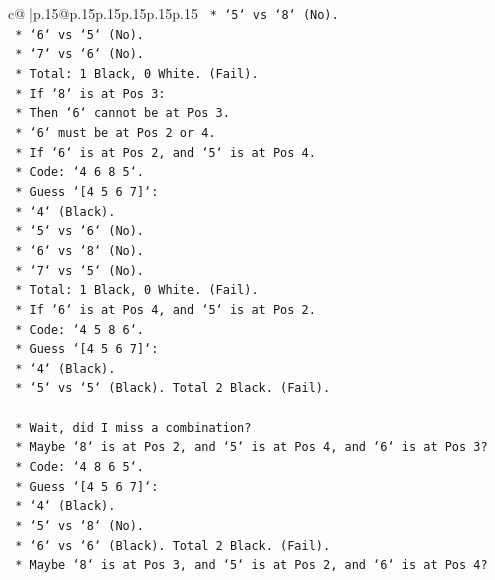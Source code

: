 \documentclass{article}
\begin{document}
{\begin{supertabular}{c@{$\;$}|p{.15\linewidth}@{}p{.15\linewidth}p{.15\linewidth}p{.15\linewidth}p{.15\linewidth}p{.15\linewidth}}
{{{\texttt{                *   `5` vs `8` (No).} \\
\texttt{                *   `6` vs `5` (No).} \\
\texttt{                *   `7` vs `6` (No).} \\
\texttt{                *   Total: 1 Black, 0 White. (Fail).} \\
\texttt{        *   If `8` is at Pos 3:} \\
\texttt{            *   Then `6` cannot be at Pos 3.} \\
\texttt{            *   `6` must be at Pos 2 or 4.} \\
\texttt{            *   If `6` is at Pos 2, and `5` is at Pos 4.} \\
\texttt{            *   Code: `4 6 8 5`.} \\
\texttt{            *   Guess `{[}4 5 6 7{]}`:} \\
\texttt{                *   `4` (Black).} \\
\texttt{                *   `5` vs `6` (No).} \\
\texttt{                *   `6` vs `8` (No).} \\
\texttt{                *   `7` vs `5` (No).} \\
\texttt{                *   Total: 1 Black, 0 White. (Fail).} \\
\texttt{            *   If `6` is at Pos 4, and `5` is at Pos 2.} \\
\texttt{            *   Code: `4 5 8 6`.} \\
\texttt{            *   Guess `{[}4 5 6 7{]}`:} \\
\texttt{                *   `4` (Black).} \\
\texttt{                *   `5` vs `5` (Black). Total 2 Black. (Fail).} \\
\\ 
\texttt{    *   Wait, did I miss a combination?} \\
\texttt{    *   Maybe `8` is at Pos 2, and `5` is at Pos 4, and `6` is at Pos 3?} \\
\texttt{        *   Code: `4 8 6 5`.} \\
\texttt{        *   Guess `{[}4 5 6 7{]}`:} \\
\texttt{            *   `4` (Black).} \\
\texttt{            *   `5` vs `8` (No).} \\
\texttt{            *   `6` vs `6` (Black). Total 2 Black. (Fail).} \\
\texttt{    *   Maybe `8` is at Pos 3, and `5` is at Pos 2, and `6` is at Pos 4?} \\
}}}
\end{supertabular}}
\end{document}
